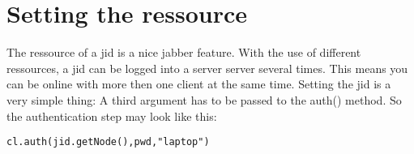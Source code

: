 \section{Setting the ressource}

The ressource of a jid is a nice jabber feature. With the use of different ressources, a jid can be logged into a server server several times. This means you can be online with more then one client 	at the same time.
Setting the jid is a very simple thing: A third argument has to be passed to the auth() method.
So the authentication step may look like this:



\begin{verbatim}
cl.auth(jid.getNode(),pwd,"laptop")
\end{verbatim}

